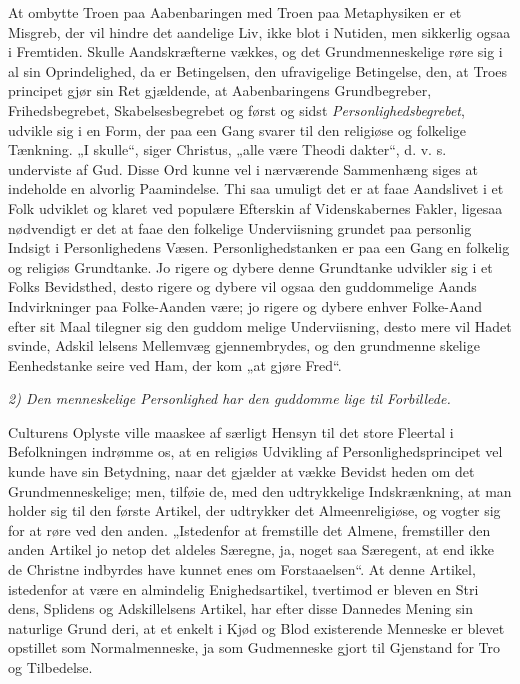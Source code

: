\documentclass[12pt]{book}
\newcommand{\opage}[1]{\marginnote{\footnotesize\textit{[#1]}}}
\begin{document}
At ombytte Troen paa Aabenbaringen med Troen
paa Metaphysiken er et Misgreb, der vil hindre det
aandelige Liv, ikke blot i Nutiden, men sikkerlig ogsaa
i Fremtiden. Skulle Aandskræfterne vækkes, og det
Grundmenneskelige røre sig i al sin Oprindelighed, da
er Betingelsen, den ufravigelige Betingelse, den, at Troes\-%
principet gjør sin Ret gjældende, at Aabenbaringens
Grundbegreber, Frihedsbegrebet, Skabelsesbegrebet og
først og sidst \textit{Personlighedsbegrebet}, udvikle sig i en Form,
\opage{146}\setcounter{footnote}{0}%
der paa een Gang svarer til den religiøse og folkelige
Tænkning. „I skulle“, siger Christus, „alle være Theodi\-%
dakter“, d. v. s. underviste af Gud. Disse Ord kunne vel i
nærværende Sammenhæng siges at indeholde en alvorlig
Paamindelse. Thi saa umuligt det er at faae Aandslivet
i et Folk udviklet og klaret ved populære Efterskin af
Videnskabernes Fakler, ligesaa nødvendigt er det at faae
den folkelige Underviisning grundet paa personlig Indsigt i
Personlighedens Væsen. Personlighedstanken er paa een
Gang en folkelig og religiøs Grundtanke. Jo rigere og
dybere denne Grundtanke udvikler sig i et Folks Bevidsthed,
desto rigere og dybere vil ogsaa den guddommelige Aands
Indvirkninger paa Folke-Aanden være; jo rigere og dybere
enhver Folke-Aand efter sit Maal tilegner sig den guddom\-%
melige Underviisning, desto mere vil Hadet svinde, Adskil\-%
lelsens Mellemvæg gjennembrydes, og den grundmenne\-%
skelige Eenhedstanke seire ved Ham, der kom „at gjøre
Fred“.

\textit{2) Den menneskelige Personlighed har den guddomme\-%
lige til Forbillede.}

Culturens Oplyste ville maaskee af særligt Hensyn
til det store Fleertal i Befolkningen indrømme os, at en
religiøs Udvikling af Personlighedsprincipet vel kunde
have sin Betydning, naar det gjælder at vække Bevidst\-%
heden om det Grundmenneskelige; men, tilføie de, med
den udtrykkelige Indskrænkning, at man holder sig til
den første Artikel, der udtrykker det Almeenreligiøse,
og vogter sig for at røre ved den anden. „Istedenfor
at fremstille det Almene, fremstiller den anden Artikel
jo netop det aldeles Særegne, ja, noget saa Særegent, at
end ikke de Christne indbyrdes have kunnet enes om
Forstaaelsen“. At denne Artikel, istedenfor at være en
almindelig Enighedsartikel, tvertimod er bleven en Stri\-%
dens, Splidens og Adskillelsens Artikel, har efter disse
\opage{147}\setcounter{footnote}{0}%
Dannedes Mening sin naturlige Grund deri, at et enkelt
i Kjød og Blod existerende Menneske er blevet opstillet
som Normalmenneske, ja som Gudmenneske gjort til
Gjenstand for Tro og Tilbedelse.
\end{document}
